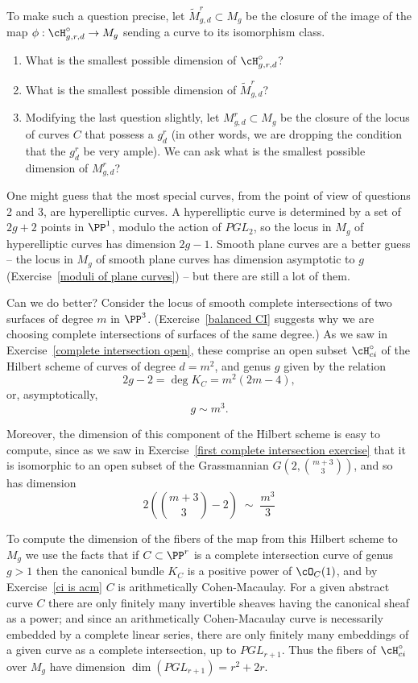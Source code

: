 To make such a question precise, let $\widetilde M^r_{g,d} \subset M_g$ be the closure of the image of the map $\phi : \cH^\circ_{g,r,d}\to M_g$ sending a curve to its isomorphism class. 
\begin{enumerate}
\item What is the smallest possible dimension of $\cH^\circ_{g,r,d}$? 
\item What is the smallest possible dimension of $\widetilde M^r_{g,d}$?
\item Modifying the last question slightly, let $M^r_{g,d} \subset M_g$ be the closure of the locus of curves $C$ that possess a $g^r_d$ (in other words, we are dropping the condition that the $g^r_d$ be very ample). We can ask what is the smallest possible dimension of $M^r_{g,d}$?
\end{enumerate}

One might guess that the most special curves, from the point of view of questions 2 and 3, are hyperelliptic curves. A hyperelliptic curve is determined by a set of $2g+2$ points in $\PP^{1}$, modulo the action of $PGL_{2}$, so the locus in $M_g$ of hyperelliptic curves has dimension $2g-1$. Smooth plane curves are a better guess  --  the locus in $M_g$ of smooth plane curves has dimension asymptotic to $g$ (Exercise~\ref{moduli of plane curves}) -- but there are still a lot of them.

Can we do better?  Consider the locus of smooth complete intersections of two surfaces of degree $m$ in $\PP^3$. (Exercise~\ref{balanced CI}  suggests why we are choosing complete intersections of surfaces of the same degree.) As we saw in Exercise~\ref{complete intersection open}, these comprise an open subset $\cH^\circ_{ci}$ of the Hilbert scheme of curves of degree $d = m^2$, and genus $g$ given by the relation
$$
2g-2 = \deg K_C = m^2(2m-4),
$$
or, asymptotically,
$$
g \sim m^3.
$$

Moreover, the dimension of this component of the Hilbert scheme is easy to compute, since as we saw in Exercise~\ref{first complete intersection exercise} that it is isomorphic to an open subset of the Grassmannian $G(2, \binom{m+3}{3})$, and so has dimension
$$
2(\binom{m+3}{3} - 2) \; \sim \; \frac{m^3}{3}
$$

To compute the dimension of the fibers of the map from this Hilbert scheme to $M_{g}$ we use 
the facts that if $C \subset \PP^r$ is a complete intersection curve of genus $g >1$ then the canonical bundle $K_C$ is a positive power of $\cO_C(1)$, and by Exercise~\ref{ci is acm}  $C$ is arithmetically Cohen-Macaulay.
For a given abstract curve $C$ there are only finitely many invertible sheaves having the canonical sheaf as a power; and since an arithmetically Cohen-Macaulay curve is necessarily embedded by a complete linear series, there are only finitely many embeddings of a given curve as a complete intersection, up to $PGL_{r+1}$. Thus the fibers of $\cH^\circ_{ci}$ over $M_g$ have dimension $\dim(PGL_{r+1}) = r^2 + 2r$.

